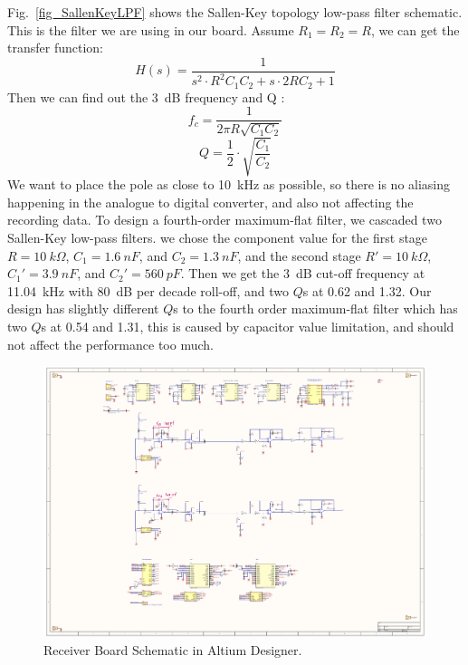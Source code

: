 Fig.~\ref{fig_SallenKeyLPF} shows the Sallen-Key topology low-pass filter schematic.  This is the filter we are using in our board.  Assume $R_1=R_2=R$, we can get the transfer function:
$$H(s) = \frac{1}{s^2 \cdot R^2 C_1 C_2 + s \cdot 2R C_2 + 1}$$
Then we can find out the \qty{3}{dB} frequency and Q \cite{Sedra_Smith}:
$$f_c = \frac{1}{2\pi R \sqrt{C_1 C_2}}$$
$$Q = \frac{1}{2} \cdot \sqrt{\frac{C_1}{C_2}}$$
We want to place the pole as close to \qty{10}{kHz} as possible, so there is no aliasing happening in the analogue to digital converter, and also not affecting the recording data.  To design a fourth-order maximum-flat filter, we cascaded two Sallen-Key low-pass filters.  we chose the component value for the first stage $R=\qty{10}{k\Omega}$, $C_1=\qty{1.6}{nF}$, and $C_2=\qty{1.3}{nF}$, and the second stage $R'=\qty{10}{k\Omega}$, $C_1'=\qty{3.9}{nF}$, and $C_2'=\qty{560}{pF}$.  Then we get the \qty{3}{dB} cut-off frequency at \qty{11.04}{kHz} with \qty{80}{dB} per decade roll-off, and two $Q$s at \qty{0.62}{} and \qty{1.32}{}.  Our design has slightly different $Q$s to the fourth order maximum-flat filter which has two $Q$s at \qty{0.54}{} and \qty{1.31}{}, this is caused by capacitor value limitation, and should not affect the performance too much.

\begin{figure}[H]
\centering
\includegraphics[width=1\linewidth]{4-ANC_Sys/ReceiverAmplifierBoardSchematic_23_5_2023.pdf}
\caption{Receiver Board Schematic in Altium Designer.}
\label{fig_sch}
\end{figure}

